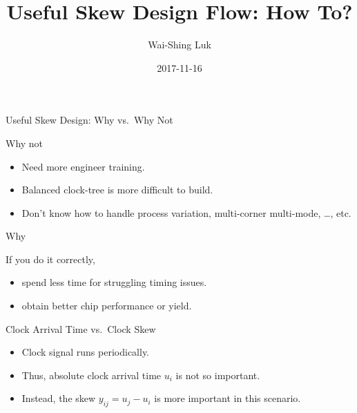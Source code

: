 \documentclass[10pt,ignorenonframetext,mathserif]{beamer}
\title{Useful Skew Design Flow: How To?}
\author{Wai-Shing Luk}
\institute{Fudan University}
\date{2017-11-16}
\providecommand{\tightlist}{%
  \setlength{\itemsep}{0pt}\setlength{\parskip}{0pt}}
\begin{document}
\frame{\titlepage}

\begin{frame}
\tableofcontents[hideallsubsections]
\end{frame}

\begin{frame}{Useful Skew Design: Why vs.~Why Not}

\begin{block}{Why not}

\begin{itemize}
\tightlist
\item
  Need more engineer training.
\item
  Balanced clock-tree is more difficult to build.
\item
  Don't know how to handle process variation, multi-corner multi-mode,
  \ldots{}, etc.
\end{itemize}

\end{block}

\begin{block}{Why}

If you do it correctly,

\begin{itemize}
\tightlist
\item
  spend less time for struggling timing issues.
\item
  obtain better chip performance or yield.
\end{itemize}

\end{block}

\end{frame}

\begin{frame}{Clock Arrival Time vs.~Clock Skew}

\begin{itemize}
\item
  Clock signal runs periodically.
\item
  Thus, absolute clock arrival time \(u_i\) is not so important.
\item
  Instead, the skew \(y_{ij} = u_j - u_i\) is more important in this
  scenario.
\end{itemize}

\end{frame}
\end{document}
